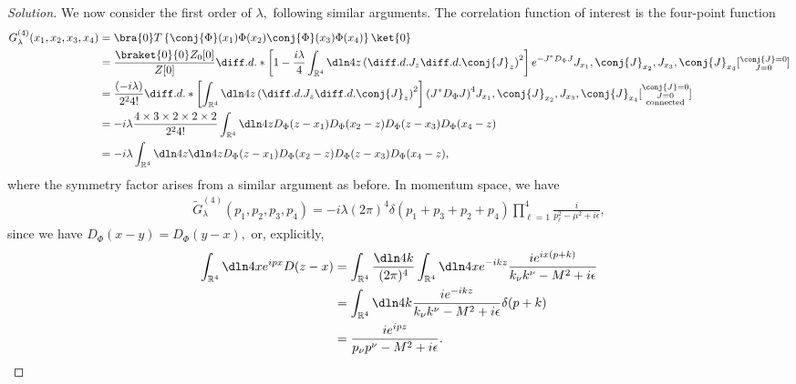 \begin{proof}[Solution]
   We now consider the first order of \(\lambda,\) following similar arguments. The correlation function of interest is the four-point function
   \begin{align*}
      G^{(4)}_\lambda(x_1, x_2,x_3,x_4) &= \bra{0}T\left\{\conj{\Phi}(x_1)\Phi(x_2)\conj{\Phi}(x_3)\Phi(x_4)\right\}\ket{0}\\
                                        &= \frac{\braket{0}{0} Z_0[0]}{Z[0]}\diff.d.*{\left[1 - \frac{i\lambda}{4}\int_{\mathbb{R}^4}{\dln4z \left(\diff.d.{}{J_z}\diff.d.{}{\conj{J}_z}\right)^2}\right]e^{-J^*D_\Phi J}}{J_{x_1},\conj{J}_{x_2},J_{x_3},\conj{J}_{x_4}}[\substack{\conj{J} = 0\\J=0}]\\
                                        &= \frac{(-i \lambda)}{2^2 4!}\diff.d.*{\left[\int_{\mathbb{R}^4}{\dln4z \left(\diff.d.{}{J_z}\diff.d.{}{\conj{J}_z}\right)^2}\right]\left(J^*D_\Phi J\right)^4}{J_{x_1},\conj{J}_{x_2},J_{x_3},\conj{J}_{x_4}}[\substack{\conj{J} = 0\\J=0\\\text{connected}}]\\
                                        &= -i\lambda\frac{4 \times 3 \times 2 \times 2 \times 2}{2^2 4!}\int_{\mathbb{R}^4} \dln4z D_\Phi(z - x_1) D_\Phi(x_2 - z) D_\Phi(z - x_3) D_\Phi(x_4 - z)\\
                                        &= -i \lambda \int_{\mathbb{R}^4} \dln4z\dln4z D_\Phi(z - x_1) D_\Phi(x_2 - z) D_\Phi(z - x_3) D_\Phi(x_4 - z),
   \end{align*}
   where the symmetry factor arises from a similar argument as before. In momentum space, we have
   \begin{align*}
      \tilde{G}^{(4)}_{\lambda}(p_1, p_2, p_3, p_4) 
                                              = -i \lambda (2\pi)^4 \delta(p_1 + p_3 + p_2 + p_4) \prod_{\ell = 1}^{4}{\frac{i}{p_{\ell}^2 - \mu^2 + i \epsilon}},
   \end{align*}
   since we have \(D_\Phi(x - y) = D_\Phi(y -x),\) or, explicitly,
   \begin{align*}
      \int_{\mathbb{R}^4} \dln4x  e^{ipx} D(z - x) &= \int_{\mathbb{R}^4} \frac{\dln4k}{(2\pi)^4} \int_{\mathbb{R}^4}\dln4x e^{-ikz} \frac{ie^{ix(p + k)}}{k_\nu k^\nu - M^2 + i \epsilon}\\
                                                   &= \int_{\mathbb{R}^4} \dln4k \frac{ie^{-ikz}}{k_\nu k^\nu - M^2 + i \epsilon} \delta(p + k)\\
                                                   &= \frac{i e^{ipz}}{p_\nu p^\nu - M^2 + i \epsilon}.
   \end{align*}


\end{proof}
